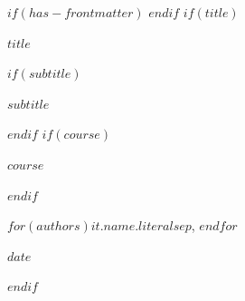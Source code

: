 $if(has-frontmatter)$
\frontmatter
$endif$
$if(title)$
\begin{center}
{\fontsize{14pt}{17pt}\selectfont\bfseries $title$\par}
\vspace{0.6em}
$if(subtitle)$
{\fontsize{12pt}{15pt}\selectfont\bfseries $subtitle$\par}
\vspace{1em}
$endif$
$if(course)$
{\fontsize{12pt}{15pt}\selectfont $course$\par}
\vspace{0.6em}
$endif$
{\fontsize{12pt}{15pt}\selectfont $for(authors)$$it.name.literal$$sep$, $endfor$\par}
\vspace{0.3em}
{\fontsize{12pt}{15pt}\selectfont $date$\par}
\end{center}
\vspace{1em}
$endif$
